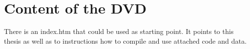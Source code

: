 \chapter{Content of the DVD}

There is an index.htm that could be used as starting point. It points to this thesis as well as to instructions how to compile and use attached code and data.
